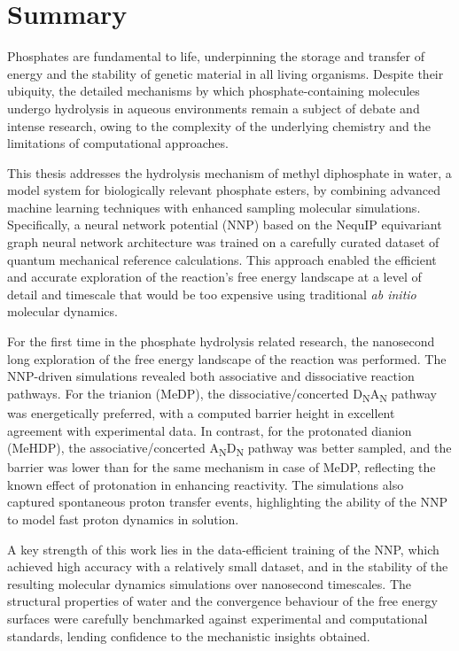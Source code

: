 \chapter*{Summary}
Phosphates are fundamental to life, underpinning the storage and transfer of energy and the stability of genetic material in all living organisms. Despite their ubiquity, the detailed mechanisms by which phosphate-containing molecules undergo hydrolysis in aqueous environments remain a subject of debate and intense research, owing to the complexity of the underlying chemistry and the limitations of computational approaches.

This thesis addresses the hydrolysis mechanism of methyl diphosphate in water, a model system for biologically relevant phosphate esters, by combining advanced machine learning techniques with enhanced sampling molecular simulations. Specifically, a neural network potential (NNP) based on the NequIP equivariant graph neural network architecture was trained on a carefully curated dataset of quantum mechanical reference calculations. This approach enabled the efficient and accurate exploration of the reaction's free energy landscape at a level of detail and timescale that would be too expensive using traditional \textit{ab initio} molecular dynamics.

For the first time in the phosphate hydrolysis related research, the nanosecond long exploration of the free energy landscape of the reaction was performed. The NNP-driven simulations revealed both associative and dissociative reaction pathways. For the trianion (MeDP), the dissociative/concerted D\textsubscript{N}A\textsubscript{N} pathway was energetically preferred, with a computed barrier height in excellent agreement with experimental data. In contrast, for the protonated dianion (MeHDP), the associative/concerted A\textsubscript{N}D\textsubscript{N} pathway was better sampled, and the barrier was lower than for the same mechanism in case of MeDP, reflecting the known effect of protonation in enhancing reactivity. The simulations also captured spontaneous proton transfer events, highlighting the ability of the NNP to model fast proton dynamics in solution.

A key strength of this work lies in the data-efficient training of the NNP, which achieved high accuracy with a relatively small dataset, and in the stability of the resulting molecular dynamics simulations over nanosecond timescales. The structural properties of water and the convergence behaviour of the free energy surfaces were carefully benchmarked against experimental and computational standards, lending confidence to the mechanistic insights obtained.

